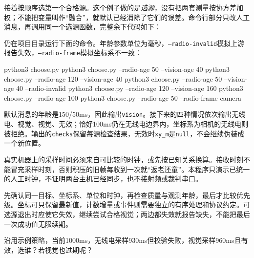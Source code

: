 接着按顺序选第一个合格源。这个例子做的是\emph{选源}，没有把两套测量按协方差加权；不能把变量叫作“融合”，就默认已经消除了它们的误差。命令行部分只改人工消息，再调用同一个选源函数，完整余下代码如下：

\par\vspace{6pt}
\noindent\begin{minipage}[t]{\linewidth}

\end{minipage}\par\vspace{6pt}


\begin{example}[看清回退和边界]
仍在项目目录运行下面的命令。年龄参数单位为毫秒，\texttt{--radio-invalid}模拟上游报告失效，\texttt{--radio-frame}模拟坐标系不一致：
\begin{tbash}
python3 choose.py
python3 choose.py --radio-age 50 --vision-age 40
python3 choose.py --radio-age 120 --vision-age 40
python3 choose.py --radio-age 50 --vision-age 40 --radio-invalid
python3 choose.py --radio-age 120 --vision-age 160
python3 choose.py --radio-age 100
python3 choose.py --radio-age 50 --radio-frame camera
\end{tbash}
默认消息的年龄是150/50ms，因此输出\texttt{vision}。接下来的四种情况依次输出无线电、视觉、视觉、无效；恰好100ms仍在无线电边界内，坐标系为相机的无线电则被拒绝。输出的\texttt{checks}保留每源检查结果，无效时\texttt{xy\_m}是\texttt{null}，不会继续伪装成一个新位置。
\end{example}

\begin{note}
真实机器上的采样时间必须来自可比较的时钟，或先按已知关系换算。接收时刻不能冒充采样时刻，否则积压的旧帧每收到一次就“返老还童”。本程序只演示已统一的人工时钟，不证明两台主机已经同步，也不接射频或裁判串口。
\end{note}

\begin{conclusion}
先确认同一目标、坐标系、单位和时钟，再检查质量与观测年龄，最后才比较优先级。坐标可只保留最新值，计数增量或事件则需要独立的有序处理和协议约定。可选源退出时应使它失效，继续尝试合格视觉；两边都失效就报告缺失，不能把最后一次成功值无限续期。
\end{conclusion}

\begin{exercise}
\label{v3-ex-radar-4}
沿用示例策略，当前1000ms，无线电采样930ms但校验失败，视觉采样960ms且有效，选谁？若视觉也过期呢？
\end{exercise}

